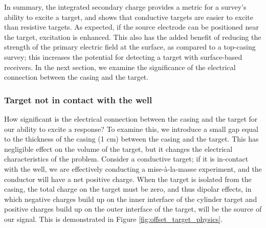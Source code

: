 \documentclass[extra,mreferee]{gji}
\begin{document}
In summary, the integrated secondary charge provides a metric for a survey's ability to excite a target, and shows that conductive targets are easier to excite than resistive targets. As expected, if the source electrode can be positioned near the target, excitation is enhanced. This also has the added benefit of reducing the strength of the primary electric field at the surface, as compared to a top-casing survey; this  increases the potential for detecting a target with surface-based receivers. In the next section, we examine the significance of the electrical connection between the casing and the target.


\subsubsection{Target not in contact with the well}

How significant is the electrical connection between the casing and the target for our ability to excite a response? To examine this, we introduce a small gap equal to the thickness of the casing (1 cm) between the casing and the target. This has negligible effect on the volume of the target, but it changes the electrical characteristics of the problem. Consider a conductive target; if it is in-contact with the well, we are effectively conducting a mise-\`a-la-masse experiment, and the conductor will have a net positive charge. When the target is isolated from the casing, the total charge on the target must be zero, and thus dipolar effects, in which negative charges build up on the inner interface of the cylinder target and positive charges build up on the outer interface of the target, will be the source of our signal. This is demonstrated in Figure \ref{fig:offset_target_physics}.


\end{document}
